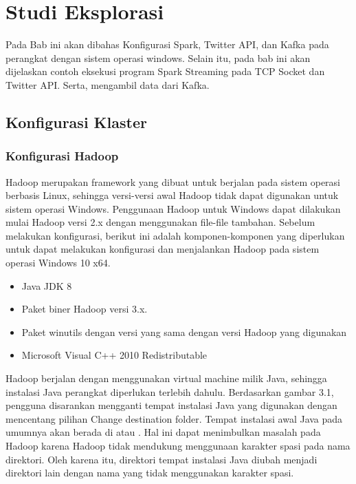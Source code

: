 \chapter{Studi Eksplorasi}
\label{chap:Eksplorasi}

Pada Bab ini akan dibahas Konfigurasi Spark, Twitter API, dan Kafka pada perangkat dengan sistem operasi windows. Selain itu, pada bab ini akan dijelaskan contoh eksekusi program Spark Streaming pada TCP Socket dan Twitter API. Serta, mengambil data dari Kafka.

\section{Konfigurasi Klaster}

\subsection{Konfigurasi Hadoop}
Hadoop merupakan framework yang dibuat untuk berjalan pada sistem operasi berbasis Linux,
sehingga versi-versi awal Hadoop tidak dapat digunakan untuk sistem operasi Windows. Penggunaan
Hadoop untuk Windows dapat dilakukan mulai Hadoop versi 2.x dengan menggunakan file-file
tambahan. Sebelum melakukan konfigurasi, berikut ini adalah komponen-komponen yang diperlukan
untuk dapat melakukan konfigurasi dan menjalankan Hadoop pada sistem operasi Windows 10 x64.

\begin{itemize}
	\item Java JDK 8
	\item Paket biner Hadoop versi 3.x.
	\item Paket winutils dengan versi yang sama dengan versi Hadoop yang digunakan
	\item Microsoft Visual C++ 2010 Redistributable
\end{itemize}

Hadoop berjalan dengan menggunakan virtual machine milik Java, sehingga instalasi Java perangkat
diperlukan terlebih dahulu. Berdasarkan gambar 3.1, pengguna disarankan mengganti tempat
instalasi Java yang digunakan dengan mencentang pilihan Change destination folder. Tempat
instalasi awal Java pada umumnya akan berada di  atau . Hal ini dapat menimbulkan masalah pada Hadoop karena Hadoop tidak
mendukung menggunaan karakter spasi pada nama direktori. Oleh karena itu, direktori tempat
instalasi Java diubah menjadi direktori lain dengan nama yang tidak menggunakan karakter spasi.

